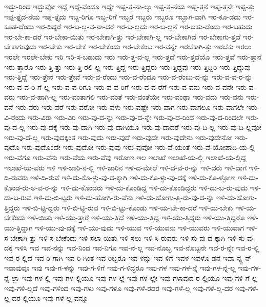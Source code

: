 {ಇದ್ದು-ರಿಂದ
ಇದ್ದುವೋ
ಇದ್ದೆ
ಇದ್ದೆ-ವೆಂದೂ
ಇದ್ದೇ
ಇಪ್ಪ-ತ್ತ-ನಾ-ಲ್ಕು
ಇಪ್ಪ-ತ್ತ-ನೆಯ
ಇಪ್ಪ-ತ್ತನೆ
ಇಪ್ಪ-ತ್ತನೇ
ಇಪ್ಪ-ತ್ತು
ಇಪ್ಪ-ತ್ತೈದ-ನೆಯ
ಇಪ್ಪ-ತ್ತೈದು
ಇಬ್ಬ-ರಿಗೂ
ಇಬ್ಬ-ರಿಗೆ
ಇಬ್ಬರ
ಇಬ್ಬರು
ಇಬ್ಬರೂ
ಇಬ್ಭಾಗ-ವಾಗಿ
ಇರ-ಕೂ-ಡದು
ಇರ-ಕೂಡ-ದೆಂದು
ಇರ-ದಿದ್ದರೆ
ಇರ-ಬ-ಲ್ಲ-ವ-ನಾ-ದರೆ
ಇರ-ಬ-ಲ್ಲದು
ಇರ-ಬ-ಲ್ಲನೆ
ಇರ-ಬಹು-ದೆಂದು
ಇರ-ಬಹುದು
ಇರ-ಬೇ-ಕಾ-ದರೆ
ಇರ-ಬೇಕಾ-ಯಿತು
ಇರ-ಬೇಕಾಗಿ-ತ್ತು
ಇರ-ಬೇಕಾಗಿ-ಲ್ಲ
ಇರ-ಬೇಕಾಗಿದೆ
ಇರ-ಬೇಕಾಗು-ತ್ತದೆ
ಇರ-ಬೇಕಾಗುವುದು
ಇರ-ಬೇಕು
ಇರ-ಬೇಕೆ
ಇರ-ಬೇಕೆಂದು
ಇರ-ಬೇಕೆಂಬ
ಇರ-ವನ್ನೇ
ಇರಬೆಕಾಗಿ-ತ್ತು
ಇರಬೆಕು
ಇರಲು
ಇರಲೇ
ಇರಲೇ-ಬೇಕು
ಇರಿ
ಇರಿ-ಸ-ಬಹುದು
ಇರು
ಇರು-ತ್ತ-ದ-ಲ್ಲ
ಇರು-ತ್ತದೆ
ಇರು-ತ್ತದೆಯೊ
ಇರು-ತ್ತವೆ
ಇರು-ತ್ತಾನೆ
ಇರು-ತ್ತಾರೊ
ಇರು-ತ್ತಿ-ತ್ತು
ಇರು-ತ್ತಿ-ರಲಿ-ಲ್ಲ
ಇರು-ತ್ತಿದ್ದ
ಇರು-ತ್ತಿದ್ದರು
ಇರು-ತ್ತಿದ್ದವು
ಇರು-ತ್ತಿದ್ದಿರಿ
ಇರು-ತ್ತಿದ್ದುವು
ಇರು-ತ್ತಿದ್ದೆ
ಇರು-ತ್ತೇನೆ
ಇರು-ತ್ತೇವೆ
ಇರು-ವ-ರೆಂದು
ಇರು-ವ-ರೆಂದೂ
ಇರು-ವ-ರೆಂಬು-ದ-ನ್ನು
ಇರು-ವ-ವ-ರ-ನ್ನು
ಇರು-ವ-ವ-ರಿ-ಗೆ-ಲ್ಲ
ಇರು-ವ-ವ-ರಿಗೂ
ಇರು-ವ-ವ-ರಿಗೆ
ಇರು-ವ-ವ-ರೆಗೆ
ಇರು-ವ-ವನು
ಇರು-ವ-ವನೇ
ಇರು-ವ-ವರು
ಇರು-ವ-ಹಾಗಿ-ಲ್ಲ
ಇರು-ವಂತಾಗಲಿ
ಇರು-ವಂತೆ
ಇರು-ವಂತೆಯೇ
ಇರು-ವಂಥಾ
ಇರು-ವದು
ಇರು-ವನು
ಇರು-ವನೆ
ಇರು-ವರು
ಇರು-ವರೆ
ಇರು-ವರೋ
ಇರು-ವಳು
ಇರು-ವಷ್ಟೇ
ಇರು-ವಾಗ
ಇರು-ವಾಗಲೂ
ಇರು-ವಾಗಲೇ
ಇರು-ವಿ-ರೆಂದು
ಇರು-ವಿರಾ
ಇರು-ವಿರಿ
ಇರು-ವು-ದ-ನ್ನು
ಇರು-ವು-ದ-ನ್ನೇ
ಇರು-ವು-ದ-ರಿಂದ
ಇರು-ವು-ದ-ರಿಂದಲೇ
ಇರು-ವು-ದ-ಲ್ಲ
ಇರು-ವು-ದಕ್ಕೆ
ಇರು-ವು-ದಾಗಿ
ಇರು-ವು-ದಾಗಿಯೂ
ಇರು-ವು-ದಾದರೆ
ಇರು-ವು-ದಿ-ಲ್ಲ
ಇರು-ವು-ದಿ-ಲ್ಲವೋ
ಇರು-ವು-ದೆ-ಲ್ಲ
ಇರು-ವುದಕ್ಕಿಂತ
ಇರು-ವುದು
ಇರು-ವುದೆ
ಇರು-ವುದೇ
ಇರು-ವುದೇನು
ಇರು-ವುದೇನೋ
ಇರು-ವುದೊ
ಇರು-ವುದೊಂದೇ
ಇರು-ವುದೋ
ಇರು-ವುವು
ಇರು-ವುವೋ
ಇರು-ವೆ-ಯಂತೆ
ಇರು-ವೆ-ಯೋಪಾದಿ-ಯ-ಲ್ಲಿ
ಇರು-ವೆಗೂ
ಇರು-ವೆನು
ಇರು-ವೆಯ
ಇರು-ವೆವು
ಇರೋಣ
ಇಲ
ಇಲಾಖೆ
ಇಲಾಖೆ-ಯ-ಲ್ಲಿ
ಇಲಾಖೆ-ಯ-ಲ್ಲಿದ್ದ
ಇಲಾಖೆ-ಯ-ವರು
ಇಳಿ
ಇಳಿ-ಜಾರಿ-ನ-ಲ್ಲಿ
ಇಳಿ-ಜಾರಿನ
ಇಳಿ-ದ-ಮೇಲೆ
ಇಳಿ-ದ-ವ-ರ-ನ್ನು
ಇಳಿ-ದರು
ಇಳಿ-ದಾಗ
ಇಳಿ-ದಿ-ರುವರು
ಇಳಿ-ದಿ-ರುವೆ
ಇಳಿ-ದು-ಕೊ-ಳ್ಳು-ವು-ದ-ಕ್ಕಾಗಿ
ಇಳಿ-ದು-ಕೊ-ಳ್ಳು-ವು-ದಕ್ಕೆ
ಇಳಿ-ದು-ಕೊ-ಳ್ಳೋಣ
ಇಳಿ-ದು-ಕೊಂಡ-ರು-ಅ-ವ-ರ-ನ್ನು
ಇಳಿ-ದು-ಕೊಂಡರು
ಇಳಿ-ದು-ಕೊಂಡಿದ್ದ
ಇಳಿ-ದು-ಕೊಂಡಿದ್ದರು
ಇಳಿ-ದು-ಬ-ರು-ವುದು
ಇಳಿ-ದು-ಬ-ರುವ
ಇಳಿ-ದು-ಬಿ-ಟ್ಟರು
ಇಳಿ-ದು-ಹೋಗಿ-ರು-ವೆನು
ಇಳಿ-ದು-ಹೋಗು-ತ್ತಿ-ರು-ವು-ದ-ನ್ನು
ಇಳಿ-ದು-ಹೋಗು-ತ್ತಿದ್ದರು
ಇಳಿ-ಬಿ-ಟ್ಟಿ-ದ್ದರು
ಇಳಿ-ಬಿ-ಟ್ಟಿ-ರುವ
ಇಳಿ-ಬಿ-ಟ್ಟು-ಕೊಂಡು
ಇಳಿ-ಯ-ಬೇ-ಕಾ-ದರೆ
ಇಳಿ-ಯ-ಬೇಕು
ಇಳಿ-ಯ-ಬೇಕೆಂದು
ಇಳಿ-ಯಿತು
ಇಳಿ-ಯು-ತ್ತಾರೆ
ಇಳಿ-ಯು-ತ್ತಿದೆ
ಇಳಿ-ಯು-ತ್ತಿದ್ದ
ಇಳಿ-ಯು-ತ್ತಿದ್ದರು
ಇಳಿ-ಯು-ತ್ತಿದ್ದರೊ
ಇಳಿ-ಯು-ತ್ತಿದ್ದಾಗ
ಇಳಿ-ಯು-ವು-ದಕ್ಕೆ
ಇಳಿ-ಯು-ವುದು
ಇಳಿ-ಯುವ
ಇಳಿ-ಯುವನು
ಇಳಿ-ಯುವರು
ಇಳಿ-ಯುವಾಗ
ಇಳಿ-ಸ-ಬೇಕಾಗಿ-ತ್ತು
ಇಳಿ-ಸ-ಬೇಕೆಂದು
ಇಳಿ-ಸಲಾ-ಯಿತು
ಇಳಿ-ಸಲು
ಇಳಿ-ಸಿ-ರುವರು
ಇಳಿ-ಸು-ವು-ದ-ಕ್ಕಾಗಿ
ಇಳಿ-ಸು-ವು-ದಕ್ಕೆ
ಇಳಿಸಿ
ಇವ
ಇವ-ನನ್ನು
ಇವ-ನಿಂದ
ಇವ-ನಿಗೂ
ಇವ-ನೆ-ಲ್ಲ
ಇವ-ನೊಬ್ಬ
ಇವ-ನೊಬ್ಬನೇ
ಇವ-ರ-ನ್ನೇ
ಇವ-ರ-ಲ್ಲಿ
ಇವ-ರ-ಲ್ಲಿದೆ
ಇವ-ರಿ-ಗಾಗಿ
ಇವ-ರಿ-ಗಿಂತ
ಇವ-ರಿಬ್ಬರೂ
ಇವ-ಳನ್ನು
ಇವ-ಳಿಗೆ
ಇವಳ
ಇವಳೊ-ಡನೆ
ಇವಾ-ನ್ಸ್ಟ-ನ್
ಇವಾವುವೂ
ಇವು
ಇವು-ಗ-ಳನ್ನು
ಇವು-ಗ-ಳಿಗೆ
ಇವು-ಗ-ಳಿದ್ದರೂ
ಇವು-ಗಳ
ಇವು-ಗಳ-ನ್ನೆ
ಇವು-ಗಳ-ನ್ನೆ-ಲ್ಲ
ಇವು-ಗಳ-ನ್ನೆ-ಲ್ಲಾ
ಇವು-ಗಳ-ಲ್ಲಿ
ಇವು-ಗಳ-ಲ್ಲಿಯೂ
ಇವು-ಗಳ-ಲ್ಲೆ
ಇವು-ಗಳ-ಲ್ಲೇ
ಇವು-ಗಳಾವುದ-ರ-ಲ್ಲಿಯೂ
ಇವು-ಗಳಿ-ಗೆ-ಲ್ಲ
ಇವು-ಗಳಿ-ಲ್ಲದೆ
ಇವು-ಗಳಿಂದ
ಇವು-ಗಳು
ಇವು-ಗಳೂ
ಇವು-ಗಳೆ-ರಡರ
ಇವು-ಗಳೆ-ಲ್ಲ
ಇವು-ಗಳೆ-ಲ್ಲ-ದರ
ಇವು-ಗಳೆ-ಲ್ಲ-ದರ-ಲ್ಲಿಯೂ
ಇವು-ಗಳೆ-ಲ್ಲ-ವನ್ನೂ
}
